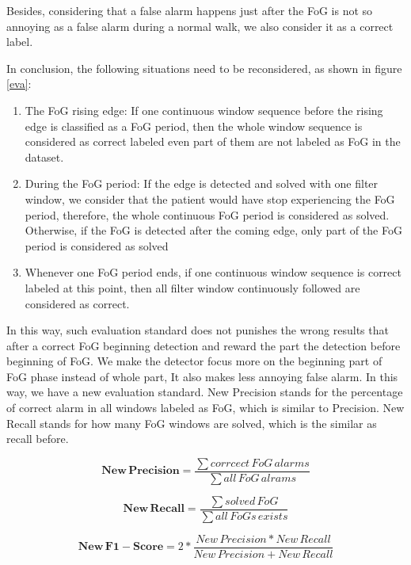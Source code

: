 \documentclass[article]{article}
\begin{document}
    Besides, considering that a false alarm happens just after the FoG is not so annoying as a false alarm during a normal walk, we also consider it as a correct label.
    
    In conclusion, the following situations need to be reconsidered, as shown in figure \ref{eva}:

    \begin{enumerate}
    	\item The FoG rising edge: If one continuous window sequence before the rising edge is classified as a FoG period, then the whole window sequence is considered as correct labeled even part of them are not labeled as FoG in the dataset.
    	
		\item During the FoG period: If the edge is detected and solved with one filter window, we consider that the patient would have stop experiencing the FoG period, therefore, the whole continuous FoG period is considered as solved. Otherwise, if the FoG is detected after the coming edge, only part of the FoG period is considered as solved
		
		\item Whenever one FoG period ends, if one continuous window sequence is correct labeled at this point, then all filter window continuously followed are considered as correct.		
    \end{enumerate}

	In this way, such evaluation standard does not punishes the wrong results that 
	after a correct FoG beginning detection and reward the part the detection before beginning of FoG. We make the detector focus more on the beginning part of FoG phase instead of whole part, It also makes less annoying false alarm.
	In this way, we have a new evaluation standard. New Precision stands for the percentage of correct alarm in all windows labeled as FoG, which is similar to Precision. New Recall stands for how many FoG windows are solved, which is the similar as recall before.
	
	\begin{equation}
	\mathbf{New\,Precision} = \frac{\sum corrcect\,FoG\,alarms}{\sum all\,FoG\,alrams}
	\end{equation}
	
	\begin{equation}
	\mathbf{New\,Recall} = \frac{\sum solved\,FoG}{\sum all\,FoGs\,exists}
	\end{equation}
	
	\begin{equation}
	\mathbf{New\,F1-Score} = 2*\frac{New\,Precision * New\,Recall}{New\,Precision+New\,Recall}
	\end{equation}
	
\end{document}
